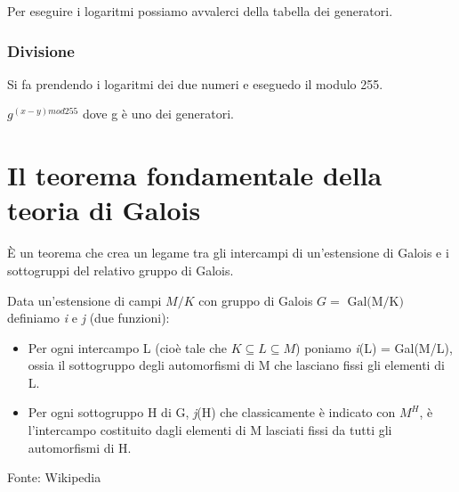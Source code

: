  

\textsf{\small Per eseguire i logaritmi possiamo avvalerci della tabella dei generatori.} %


\subsubsection{Divisione}

 

\textsf{\small Si fa prendendo i logaritmi dei due numeri e eseguedo il modulo 255.}

\textsf{\small $g^{(x - y) mod 255}$ dove g è uno dei generatori. }





\section{Il teorema fondamentale della teoria di Galois} %

   

\textsf{\small È un teorema che crea un legame tra gli intercampi di un'estensione di Galois e i sottogruppi del relativo gruppo di Galois.}

\textsf{\small Data un'estensione di campi $M/K$ con gruppo di Galois $G = \text{ Gal(M/K)}$ definiamo \emph{i} e \emph{j} (due funzioni): }

\begin{itemize}
	\item \textsf{\small Per ogni intercampo L (cioè tale che $K \subseteq L \subseteq M$) poniamo \emph{i}(L) = Gal(M/L), ossia il sottogruppo degli automorfismi di M che lasciano fissi gli elementi di L.}
	\item \textsf{\small Per ogni sottogruppo H di G, \emph{j}(H) che classicamente è indicato con $M^H$, è l'intercampo costituito dagli elementi di M lasciati fissi da tutti gli automorfismi di H.}
\end{itemize}

\textsf{\small Fonte: Wikipedia \cite{wikipediateoremafondamentaledigalois} } 

